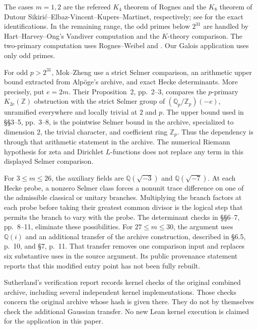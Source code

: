 \documentclass[11pt]{article}
\theoremstyle{definition}\newtheorem{definition}[theorem]{Definition}
\begin{document}
The cases $m=1,2$ are the refereed $K_4$ theorem of Rognes
and the $K_8$ theorem of Dutour Sikiri\'c--Elbaz-Vincent--Kupers--Martinet,
respectively; see \cite[\S2, pp.~2--3]{MZ} for the exact
identifications. In the remaining range, the odd primes below
$2^{31}$ are handled by Hart--Harvey--Ong's Vandiver computation
\cite[\S1, assertion~(2)]{HHO} and the $K$-theory comparison.
The two-primary computation uses Rognes--Weibel and
\cite[VI, Corollary~9.8]{Weibel}. Our Galois application uses
only odd primes.

For odd $p>2^{31}$, Mok--Zheng use a strict Selmer comparison,
an arithmetic upper bound extracted from Alp\"oge's archive,
and exact Hecke determinants. More precisely, put $e=2m$.
Their Proposition~2, pp.~2--3, compares the $p$-primary
$K_{2e}(\mathbb Z)$ obstruction with the strict Selmer group
of $(\mathbb Q_p/\mathbb Z_p)(-e)$, unramified everywhere and
locally trivial at $2$ and $p$. The upper bound used in
\S\S3--5, pp.~3--8, is the pointwise Selmer bound in the
archive, specialized to dimension $2$, the trivial character,
and coefficient ring $\mathbb Z_p$. Thus the dependency is
through that arithmetic statement in the archive. The
numerical Riemann hypothesis for zeta and Dirichlet $L$-functions
does not replace any term in this displayed Selmer comparison.

For $3\leq m\leq26$, the auxiliary fields are
$\mathbb Q(\sqrt{-3})$ and $\mathbb Q(\sqrt{-7})$.
At each Hecke probe, a nonzero Selmer class forces a nonunit
trace difference on one of the admissible classical or
unitary branches. Multiplying the branch factors at each
probe before taking their greatest common divisor is the
logical step that permits the branch to vary with the probe.
The determinant checks in \S\S6--7, pp.~8--11, eliminate
these possibilities. For $27\leq m\leq30$, the argument uses
$\mathbb Q(i)$ and an additional transfer of the archive
construction, described in \S6.5, p.~10, and \S7, p.~11.
That transfer removes one comparison input and replaces six
substantive uses in the source argument. Its public provenance
statement reports that this modified entry point has not
been fully rebuilt.

Sutherland's verification report \cite{Sutherland} records
kernel checks of the original combined archive, including
several independent kernel implementations. Those checks
concern the original archive whose hash is given there.
They do not by themselves check the additional Gaussian
transfer. No new Lean kernel execution is claimed for the
application in this paper.
\end{document}
